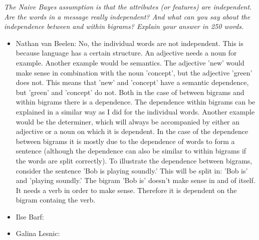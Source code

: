 \documentclass{article}
\begin{document}
\textit{ The Naive Bayes assumption is that the attributes (or features) are independent.  Are the
words  in  a  message  really  independent?   And  what  can  you  say  about  the  independence
between and within bigrams?  Explain your answer in 250 words.}
\begin{itemize}
    \item Nathan van Beelen: No, the individual words are not independent. This is
                             because language has a certain structure. An adjective
                             needs a noun for example. Another example would be
                             semantics. The adjective 'new' would make sense in 
                             combination with the noun 'concept', but the adjective
                             'green' does not. This means that 'new' and 'concept'
                             have a semantic dependence, but 'green' and 'concept'
                             do not. Both in the case of between bigrams
                             and within bigrams there is a dependence. The dependence within
                             bigrams can be explained in a similar way as I did for the
                             individual words. Another example would be the determiner,
                             which will always be accompanied by either an adjective or
                             a noun on which it is dependent. In the case of the dependence
                             between bigrams it is mostly due to the dependence of words
                             to form a sentence (although the dependence can also be similar
                             to within bigrams if the words are split correctly).
                             To illustrate the dependence between bigrams, consider the
                             sentence 'Bob is playing soundly.' This will be split in:
                             'Bob is' and 'playing soundly.' The bigram 'Bob is' doesn't
                             make sense in and of itself. It needs a verb in order to make
                             sense. Therefore it is dependent on the bigram containg the
                             verb.
    \item Ilse Barf:
    \item Galina Lesnic:
\end{itemize}
\end{document}
